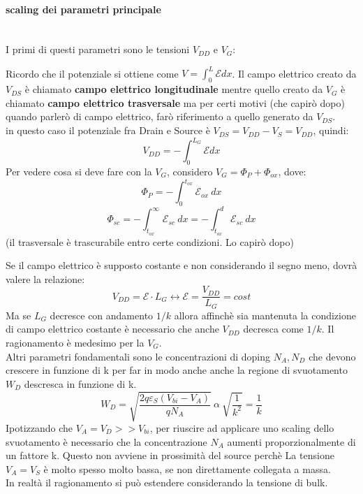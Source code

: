 \paragraph{scaling dei parametri principale}\mbox{}\\
I primi di questi parametri sono le tensioni $V_{DD}$ e $V_G$:
%
\begin{ripasso}
    Ricordo che il potenziale si ottiene come $V=\int_{0}^{L} \mathcal{E}dx$. Il campo elettrico creato da $V_{DS}$ è chiamato \textbf{campo elettrico longitudinale} mentre quello creato da $V_G$ è chiamato \textbf{ campo elettrico trasversale} ma per certi motivi (che capirò dopo) quando parlerò di campo elettrico, farò riferimento a quello generato da $V_{DS}$.\\
    in questo caso il potenziale fra Drain e Source è $V_{DS}=V_{DD}-V_S=V_{DD}$, quindi:
    \begin{equation*}
        V_{DD}=-\int_{0}^{L_G} \mathcal{E}dx
    \end{equation*}
    Per vedere cosa si deve fare con la $V_G$, considero $V_G=\Phi_P+\Phi_{ox}$, dove:
    \begin{equation*}
        \Phi_P=-\int_{0}^{t_{ox}} \mathcal{E}_{ox}\ dx
    \end{equation*}
    \begin{equation*}
        \Phi_{sc}=-\int_{t_{ox}}^{\infty} \mathcal{E}_{sc}\ dx=
        -\int_{t_{ox}}^{d} \mathcal{E}_{sc}\ dx
    \end{equation*}
    (il trasversale è trascurabile entro certe condizioni. Lo capirò dopo)
\end{ripasso}
%
\cleardoublepage
Se il campo elettrico è supposto costante e non considerando il segno meno, dovrà valere la relazione:
%
\begin{equation}
    V_{DD} = \mathcal{E} \cdot L_G \longleftrightarrow \mathcal{E}=\dfrac{V_{DD}}{L_G} =cost
\end{equation}
%
Ma se $L_{G}$ decresce con andamento $1/k$ allora affinchè sia mantenuta la condizione di campo elettrico costante è necessario che anche $V_{DD}$ decresca come $1/k$. Il ragionamento è medesimo per la $V_G$.\\

Altri parametri fondamentali sono le concentrazioni di doping $N_A,N_D$ che devono crescere in funzione di k per far in modo anche anche la regione di svuotamento $W_D$ descresca in funzione di k.
\begin{equation}
    W_D=\sqrt{\dfrac{2q\varepsilon_S (V_{bi}-V_{A})}{qN_A}}\ \alpha \ \sqrt{\dfrac{1}{k^2}}=\dfrac{1}{k}
\end{equation}
Ipotizzando che $V_A=V_D>>V_{bi}$, per riuscire ad applicare uno scaling dello svuotamento è necessario che la concentrazione $N_{A}$ aumenti proporzionalmente di un fattore k.
Questo non avviene in prossimità del source perchè La tensione $V_A=V_S$ è molto spesso molto bassa, se non direttamente collegata a massa.\\
In realtà il ragionamento si può estendere considerando la tensione di bulk.\\

